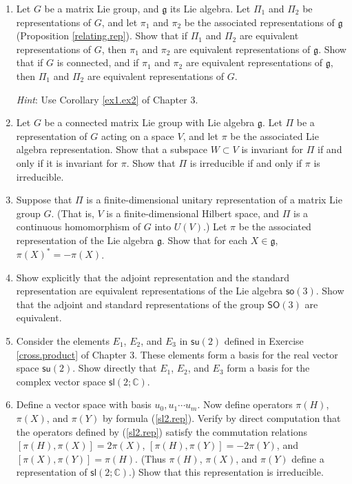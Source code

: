 \documentclass[12pt]{amsbook}
\let \frak = \mathfrak
\theoremstyle{plain}
\numberwithin{equation}{chapter}
\numberwithin{theorem}{chapter}
\begin{document}
\begin{enumerate}
\item  Let $G$ be a matrix Lie group, and $\frak{g}$ its Lie algebra. Let
$\Pi_{1}$ and $\Pi_{2}$ be representations of $G$, and let $\pi_{1}$ and
$\pi_{2}$ be the associated representations of $\frak{g}$ (Proposition
\ref{relating.rep}). Show that if $\Pi_{1}$ and $\Pi_{2}$ are equivalent
representations of $G$, then $\pi_{1}$ and $\pi_{2}$ are equivalent
representations of $\frak{g}$. Show that if $G$ is connected, and if $\pi_{1}$
and $\pi_{2}$ are equivalent representations of $\frak{g}$, then $\Pi_{1}$ and
$\Pi_{2}$ are equivalent representations of $G$.

\textit{Hint}: Use Corollary \ref{ex1.ex2} of Chapter 3.

\item  Let $G$ be a connected matrix Lie group with Lie algebra $\frak{g}$.
Let $\Pi$ be a representation of $G$ acting on a space $V$, and let $\pi$ be
the associated Lie algebra representation. Show that a subspace $W\subset V$
is invariant for $\Pi$ if and only if it is invariant for $\pi$. Show that
$\Pi$ is irreducible if and only if $\pi$ is irreducible.

\item  Suppose that $\Pi$ is a finite-dimensional unitary representation of a
matrix Lie group $G$. (That is, $V$ is a finite-dimensional Hilbert space, and
$\Pi$ is a continuous homomorphism of $G$ into $U(V)$.) Let $\pi$ be the
associated representation of the Lie algebra $\frak{g}$. Show that for each
$X\in\frak{g}$, $\pi(X)^{\ast}=-\pi(X)$.

\item \label{equiv.rep}Show explicitly that the adjoint representation and the
standard representation are equivalent representations of the Lie algebra
$\mathsf{so}(3)$. Show that the adjoint and standard representations of the
group $\mathsf{SO}(3)$ are equivalent.

\item \label{su2.sl2}Consider the elements $E_{1}$, $E_{2}$, and $E_{3}$ in
$\mathsf{su}(2)$ defined in Exercise \ref{cross.product} of Chapter 3. These
elements form a basis for the real vector space $\mathsf{su}(2)$. Show
directly that $E_{1}$, $E_{2}$, and $E_{3}$ form a basis for the complex
vector space $\mathsf{sl}(2;\mathbb{C})$.

\item \label{sl2.check}Define a vector space with basis $u_{0},u_{1}\cdots
u_{m}$. Now define operators $\pi(H)$, $\pi(X)$, and $\pi(Y)$ by formula
(\ref{sl2.rep}). Verify by direct computation that the operators defined by
(\ref{sl2.rep}) satisfy the commutation relations $\left[  \pi(H),\pi
(X)\right]  =2\pi(X)$, $\left[  \pi(H),\pi(Y)\right]  =-2\pi(Y)$, and $\left[
\pi(X),\pi(Y)\right]  =\pi(H)$. (Thus $\pi(H)$, $\pi(X)$, and $\pi(Y)$ define
a representation of $\mathsf{sl}(2;\mathbb{C})$.) Show that this
representation is irreducible.


\end{enumerate}
\end{document}
